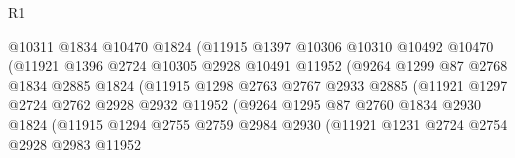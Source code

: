 \begin{lexlean}{R1}
\begin{coremodule}
                                @10311
                                @1834
                                @10470
                                @1824
                                (@11915
                                  @1397
                                  @10306
                                  @10310
                                  @10492
                                  @10470
                                  (@11921
                                    @1396
                                    @2724
                                    @10305
                                    @2928
                                    @10491
                                    @11952
                                    (@9264
                                      @1299
                                      @87
                                      @2768
                                      @1834
                                      @2885
                                      @1824
                                      (@11915
                                        @1298
                                        @2763
                                        @2767
                                        @2933
                                        @2885
                                        (@11921
                                          @1297
                                          @2724
                                          @2762
                                          @2928
                                          @2932
                                          @11952
                                          (@9264
                                            @1295
                                            @87
                                            @2760
                                            @1834
                                            @2930
                                            @1824
                                            (@11915
                                              @1294
                                              @2755
                                              @2759
                                              @2984
                                              @2930
                                              (@11921
                                                @1231
                                                @2724
                                                @2754
                                                @2928
                                                @2983
                                                @11952

\end{coremodule}
\end{lexlean}
